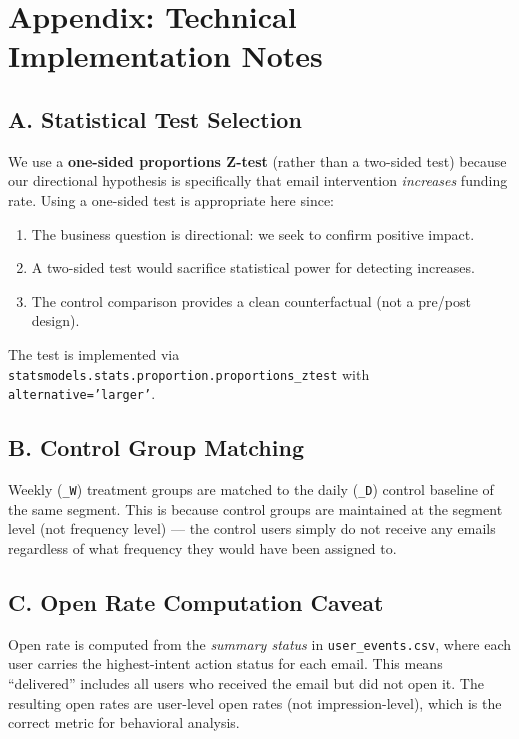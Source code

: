\documentclass[12pt,a4paper]{article}
\begin{document}
\clearpage
{}
\section*{Appendix: Technical Implementation Notes}

\subsection*{A. Statistical Test Selection}

We use a \textbf{one-sided proportions Z-test} (rather than a two-sided test) because
our directional hypothesis is specifically that email intervention \textit{increases}
funding rate. Using a one-sided test is appropriate here since:

\begin{enumerate}[leftmargin=2em]
  \item The business question is directional: we seek to confirm positive impact.
  \item A two-sided test would sacrifice statistical power for detecting increases.
  \item The control comparison provides a clean counterfactual (not a pre/post design).
\end{enumerate}

The test is implemented via \texttt{statsmodels.stats.proportion.proportions\_ztest}
with \texttt{alternative='larger'}.

\subsection*{B. Control Group Matching}

Weekly (\texttt{\_W}) treatment groups are matched to the daily (\texttt{\_D}) control
baseline of the same segment. This is because control groups are maintained at the
segment level (not frequency level) — the control users simply do not receive any
emails regardless of what frequency they would have been assigned to.

\subsection*{C. Open Rate Computation Caveat}

Open rate is computed from the \textit{summary status} in \texttt{user\_events.csv},
where each user carries the highest-intent action status for each email. This means
``delivered'' includes all users who received the email but did not open it. The
resulting open rates are user-level open rates (not impression-level), which is the
correct metric for behavioral analysis.
\end{document}
